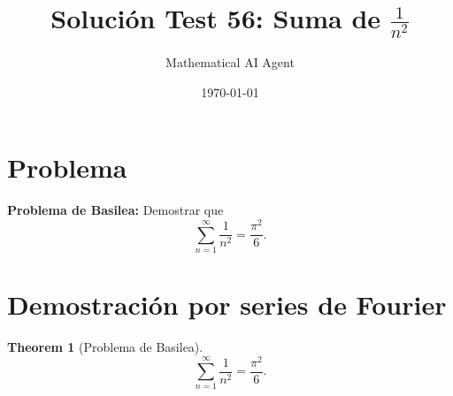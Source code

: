 \documentclass[11pt,a4paper]{article}
\title{Soluci\'on Test 56: Suma de $\frac{1}{n^2}$}
\author{Mathematical AI Agent}
\date{\today}
\theoremstyle{plain}
\newtheorem{theorem}{Theorem}[section]
\theoremstyle{definition}
\begin{document}
\maketitle
\section{Problema}
\textbf{Problema de Basilea:} Demostrar que
\[
\sum_{n=1}^{\infty} \frac{1}{n^2} = \frac{\pi^2}{6}.
\]

\section{Demostraci\'on por series de Fourier}

\begin{theorem}[Problema de Basilea]
\label{thm:basilea}
\[
\sum_{n=1}^{\infty} \frac{1}{n^2} = \frac{\pi^2}{6}.
\]
\end{theorem}
\end{document}
